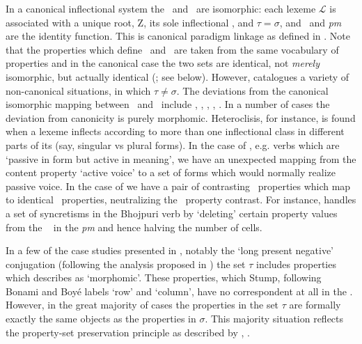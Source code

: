 \documentclass[output=paper,colorlinks,citecolor=brown]{langscibook}
\begin{document}
In a canonical inflectional system the  \PC\ and \PF\ are isomorphic: each lexeme $\mathcal{L}$ is associated with a unique root, Z, its sole inflectional , and $\tau=\sigma$, and  \Corr\ and  \textit{pm} are the identity function. This is canonical paradigm linkage as defined in  \citet[113, example (2)]{stump2016}. Note that the properties which define \PC\ and \PF\ are taken from the same vocabulary of properties and in the canonical case the two sets are identical, not \textit{merely} isomorphic, but actually identical (\citealp[113]{stump2016}; see below). %
However, \citet{stump2016} catalogues a variety of non-canonical situations, in which $\tau\neq\sigma$. 
The deviations from the canonical isomorphic mapping between \PC\  and \PF\ include , , , , . In a number of cases  the deviation from canonicity is purely morphomic. Heteroclisis, for instance, is found when a lexeme  inflects according to more than one inflectional class in different parts of its  (say, singular vs plural forms). In the case of , e.g.  verbs which are `passive in form but active in meaning', we have an unexpected mapping from the content property `active voice' to a set of forms which would normally realize passive voice. In the case of  we have a pair of contrasting \PC\ properties which map to identical \PF\ properties, neutralizing the \PC\ property contrast. For instance, \citet[174]{stump2016} handles a set of syncretisms in the Bhojpuri verb  by ‘deleting’ certain property values from the \PF\   in the \textit{pm} and hence halving the number of cells. 

In a few of the case studies presented in \citet{stump2016}, notably the  `long present negative' conjugation (following the analysis proposed in \citealp{bonamiboye2008}) the set $\tau$ includes properties which \citet[139]{stump2016} describes as `morphomic'. These properties, which Stump, following Bonami and Boyé labels `row' and `column', have no correspondent at all in the \PC. However, in the great majority of cases the properties in the set $\tau$ are formally exactly  the same objects as the properties in $\sigma$. This majority situation reflects the  property-set preservation principle as described by  \citet[113]{stump2016}, . 
\end{document}

